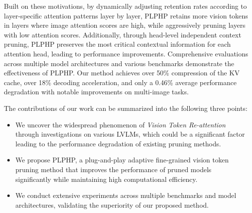Built on these motivations, by dynamically adjusting retention rates according to layer-specific attention patterns layer by layer, PLPHP retains more vision tokens in layers where image attention scores are high, while aggressively pruning layers with low attention scores. Additionally, through head-level independent context pruning, PLPHP preserves the most critical contextual information for each attention head, leading to performance improvements. Comprehensive evaluations across multiple model architectures and various benchmarks demonstrate the effectiveness of PLPHP. Our method achieves over 50\% compression of the KV cache, over 18\% decoding acceleration, and only a 0.46\% average performance degradation with notable improvements on multi-image tasks.

The contributions of our work can be summarized into the following three points:
\begin{itemize}[leftmargin=*]
\setlength{\topmargin}{0pt}
\setlength{\itemsep}{0em}
    \item  We uncover the widespread phenomenon of \textit{Vision Token Re-attention} through investigations on various LVLMs, which could be a significant factor leading to the performance degradation of existing pruning methods.
    \item  We propose PLPHP, a plug-and-play adaptive fine-grained vision token pruning method that improves the performance of pruned models significantly while maintaining high computational efficiency.
    \item We conduct extensive experiments across multiple benchmarks and model architectures, validating the superiority of our proposed method.
\end{itemize}